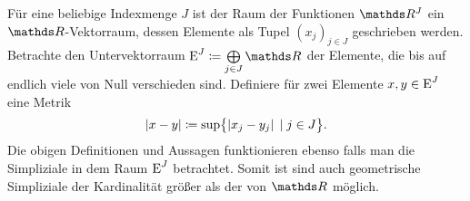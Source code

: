 \begin{Bem}
  Für eine beliebige Indexmenge $J$ ist der Raum der Funktionen $\R^J$ ein
  $\R$-Vektorraum, dessen Elemente als Tupel $(x_j)_{j \in J}$
  geschrieben werden. Betrachte den Untervektorraum
  $\E^J \coloneqq \bigoplus\limits_{j \in J} \R$ der Elemente, die bis
  auf endlich viele von Null verschieden sind. Definiere für zwei
  Elemente $x,y \in \operatorname{E}^J$ eine Metrik
  \begin{gather*}
    \left| x-y \right| \coloneqq \sup \bigl\{  \left| x_j - y_j  \right|  \; | \;  j \in J \bigr\}.
  \end{gather*}
  Die obigen Definitionen und Aussagen funktionieren ebenso falls man
  die Simpliziale in dem Raum $\operatorname{E}^J$ betrachtet. Somit ist sind auch
  geometrische Simpliziale der Kardinalität größer als der von $\R$
  möglich.
\end{Bem}




